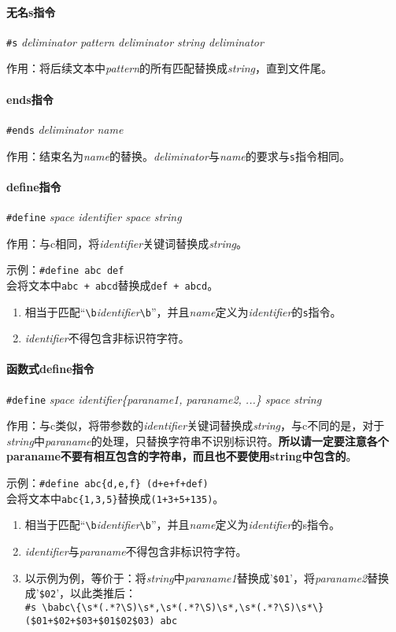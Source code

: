 \documentclass[UTF8]{ctexart}
\begin{document}
\paragraph{无名s指令} \verb|#s| \textit{deliminator pattern deliminator string deliminator}

作用：将后续文本中\textit{pattern}的所有匹配替换成\textit{string}，直到文件尾。

\paragraph{ends指令} \verb|#ends| \textit{deliminator name}

作用：结束名为\textit{name}的替换。\textit{deliminator}与\textit{name}的要求与\verb|s|指令相同。

\paragraph{define指令} \verb|#define| \textit{space identifier space string}

作用：与c相同，将\textit{identifier}关键词替换成\textit{string}。

示例：\verb|#define abc def| \\ 会将文本中\verb|abc + abcd|替换成\verb|def + abcd|。

\begin{enumerate}
	\item 相当于匹配``\verb|\b|\textit{identifier}\verb|\b|''，并且\textit{name}定义为\textit{identifier}的\verb|s|指令。
	\item \textit{identifier}不得包含非标识符字符。
\end{enumerate}

\paragraph{函数式define指令} \verb|#define| \textit{space identifier\{paraname1, paraname2, ...\} space string}

作用：与c类似，将带参数的\textit{identifier}关键词替换成\textit{string}，与c不同的是，对于\textit{string}中\textit{paraname}的处理，只替换字符串不识别标识符。\textbf{所以请一定要注意各个paraname不要有相互包含的字符串，而且也不要使用string中包含的}。

示例：\verb|#define abc{d,e,f} (d+e+f+def)| \\ 会将文本中\verb|abc{1,3,5}|替换成\verb|(1+3+5+135)|。

\begin{enumerate}
	\item 相当于匹配``\verb|\b|\textit{identifier}\verb|\b|''，并且\textit{name}定义为\textit{identifier}的s指令。
	\item \textit{identifier}与\textit{paraname}不得包含非标识符字符。
	\item 以示例为例，等价于：将\textit{string}中\textit{paraname1}替换成'\verb|$01|'，将\textit{paraname2}替换成'\verb|$02|'，以此类推后：\\
	\verb|#s \babc\{\s*(.*?\S)\s*,\s*(.*?\S)\s*,\s*(.*?\S)\s*\} ($01+$02+$03+$01$02$03) abc|
\end{enumerate}
\end{document}
